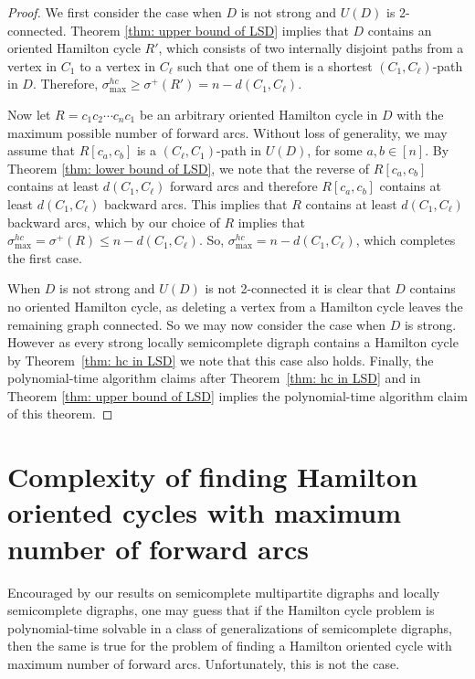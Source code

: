 \documentclass{article}
\newcommand{\QG}[1]{{#1}}
\newcommand{\GGn}[1]{{#1}}
\newcommand{\GGnn}[1]{{#1}}
\newcommand{\2}{\vspace{0.2cm}}
\begin{document}
   \begin{proof}
  We first consider the case when $D$ is not strong and $U(D)$ is 2-connected.
  Theorem \ref{thm: upper bound of LSD} implies that $D$ contains an oriented Hamilton cycle $R'$, which consists of two internally disjoint paths \GGn{from a vertex in $C_1$ to a vertex in $C_{\ell}$} such that one of them is a shortest $(C_1,C_{\ell})$-path in $D$. Therefore, \GGnn{$\sigma^{hc}_{\max} \ge \sigma^+(R') = n - d(C_1,C_{\ell})$.}

        Now let $R=c_1 c_2 \cdots c_n c_1$ be an arbitrary oriented Hamilton cycle in $D$ with the maximum possible number of forward arcs.
Without loss of generality, we may assume that $R[c_a,c_b]$ is a $(C_{\ell},C_1)$-path in $U(D)$, for some $a,b \in [n]$.
 By Theorem \ref{thm: lower bound of LSD}, we note that
the reverse of $R[c_a,c_b]$ contains at least $d(C_1,C_{\ell})$ forward arcs and therefore $R[c_a,c_b]$ contains at least $d(C_1,C_{\ell})$ backward arcs.
This implies that $R$ contains at least $d(C_1,C_{\ell})$ backward arcs, which by our choice of $R$ implies that
 \GGnn{$\sigma^{hc}_{\max} = \sigma^+(R) \leq n - d(C_1,C_{\ell})$}. So, $\sigma^{hc}_{\max} = n - d(C_1,C_{\ell})$, which completes the first case.

When $D$ is not strong and $U(D)$ is not 2-connected it is clear that $D$ contains no oriented Hamilton cycle, as deleting a vertex from a Hamilton cycle leaves the remaining graph connected. So we may now consider the case when $D$ is strong. However as every strong locally semicomplete digraph contains a Hamilton cycle by Theorem~\ref{thm: hc in LSD} we note that this case also holds.
Finally, the polynomial-time algorithm claims after Theorem~\ref{thm: hc in LSD}  and in  Theorem \ref{thm: upper bound of LSD} implies the polynomial-time algorithm claim of this theorem.
   \end{proof}

\section{Complexity of finding Hamilton oriented cycles with maximum number of forward arcs}\label{sec:disc}


\GGn{Encouraged by our results on semicomplete multipartite digraphs and locally semicomplete digraphs, one may guess that if the Hamilton cycle problem is polynomial-time solvable in a class of generalizations of semicomplete digraphs, then
the same is true for the problem of finding a Hamilton \QG{oriented} cycle with maximum number of forward arcs.} Unfortunately, this is not the case. 	
\end{document}
